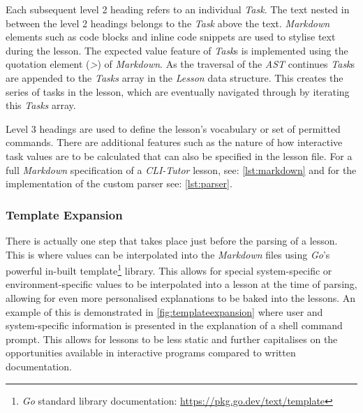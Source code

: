 Each subsequent level 2 heading refers to an individual \textit{Task}. The text
nested in between the level 2 headings belongs to the \textit{Task} above the text.
\textit{Markdown} elements such as code blocks and inline code snippets are
used to stylise text during the lesson. The expected value feature of
\textit{Task}s is implemented using the quotation element (\textit{>})
of \textit{Markdown}. As the traversal of the \textit{AST} continues
\textit{Task}s are appended to the \textit{Tasks} array in the \textit{Lesson}
data structure. This creates the series of tasks in the lesson, which are
eventually navigated through by iterating this \textit{Tasks} array. 

Level 3 headings are used to define the lesson's vocabulary or set of permitted
commands. There are additional features such as the nature of how interactive
task values are to be calculated that can also be specified in the lesson file.
For a full \textit{Markdown} specification of a \textit{CLI-Tutor} lesson, see:
\autoref{lst:markdown} and for the implementation of the custom parser see:
\autoref{lst:parser}. 

\subsubsection{Template Expansion}

There is actually one step that takes place just before the parsing of a
lesson. This is where values can be interpolated into the \textit{Markdown}
files using \textit{Go}'s powerful in-built template\footnote{\textit{Go}
    standard library documentation: \url{https://pkg.go.dev/text/template}}
    library. This allows for special system-specific or environment-specific
    values to be interpolated into a lesson at the time of parsing, allowing
    for even more personalised explanations to be baked into the lessons. An
    example of this is demonstrated in \autoref{fig:templateexpansion} where
    user and system-specific information is presented in the explanation of a
    shell command prompt. This allows for lessons to be less static and further
    capitalises on the opportunities available in interactive programs compared
    to written documentation.

